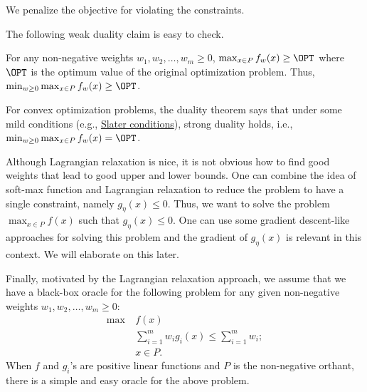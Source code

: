 \begin{intuition}
	We penalize the objective for violating the constraints.
\end{intuition}

The following weak duality claim is easy to check.

\begin{claim}
	For any non-negative weights \(w_1, w_2, \dots , w_m \geq 0\), \(\max _{x \in P} f_w(x) \geq \OPT\) where \(\OPT\) is the optimum value of the original optimization problem. Thus, \(\min _{w\geq 0} \max _{x \in P} f_w(x) \geq \OPT\).
\end{claim}

For convex optimization problems, the duality theorem says that under some mild conditions (e.g., \href{https://en.wikipedia.org/wiki/Slater%27s_condition}{Slater conditions}), strong duality holds, i.e., \(\min _{w \geq 0} \max _{x \in P} f_w(x) = \OPT\).

Although Lagrangian relaxation is nice, it is not obvious how to find good weights that lead to good upper and lower bounds. One can combine the idea of soft-max function and Lagrangian relaxation to reduce the problem to have a single constraint, namely \(g_\eta (x) \leq 0\). Thus, we want to solve the problem \(\max _{x \in P} f(x)\) such that \(g_\eta (x) \leq 0\). One can use some gradient descent-like approaches for solving this problem and the gradient of \(g_\eta (x)\) is relevant in this context. We will elaborate on this later.

Finally, motivated by the Lagrangian relaxation approach, we assume that we have a black-box oracle for the following problem for any given non-negative weights \(w_1, w_2, \dots , w_m \geq 0\):
\begin{equation}\label{eq:MWU-oracle}
	\begin{aligned}
		\max~ & f(x)                                                \\
		      & \sum_{i=1}^{m} w_i g_i(x) \leq \sum_{i=1}^{m} w_i ; \\
		      & x\in P.
	\end{aligned}
\end{equation}
When \(f\) and \(g_i\)'s are positive linear functions and \(P\) is the non-negative orthant, there is a simple and easy oracle for the above problem.

